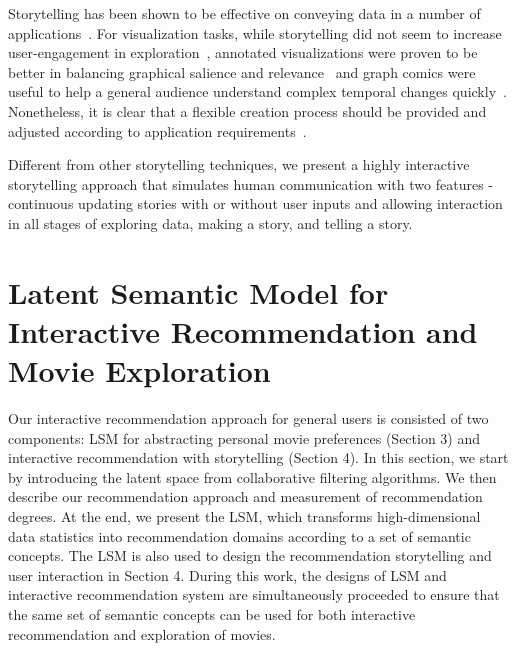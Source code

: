 \documentclass{vgtc}                          %
\begin{document}



Storytelling has been shown to be effective on conveying data in a number of applications~\cite{dragicevic2011temporal, spaulding2013design}.
For visualization tasks, while storytelling did not seem to increase user-engagement in exploration~\cite{boy2015storytelling}, annotated visualizations were proven to be better in balancing graphical salience and relevance~\cite{Hullman:2013:CAG:2470654.2481374} and graph comics were useful to help a general audience understand complex temporal changes quickly~\cite{bach2016telling}.
Nonetheless, it is clear that a flexible creation process should be provided and  adjusted according to application requirements~\cite{mitchell2011limits, 6902874, amini2015understanding}.

Different from other storytelling techniques, we present a highly interactive storytelling approach that simulates human communication with two features - continuous updating stories with or without user inputs and allowing interaction in all stages of exploring data, making a story, and telling a story.


%
\section{Latent Semantic Model for Interactive Recommendation and Movie Exploration} 
\label{latent}

Our interactive recommendation approach for general users is consisted of two components: LSM for abstracting personal movie preferences (Section 3) and interactive recommendation with storytelling (Section 4).
In this section, we start by introducing the latent space from collaborative filtering algorithms.
We then describe our recommendation approach and measurement of recommendation degrees.
At the end, we present the LSM, which transforms high-dimensional data statistics into recommendation domains according to a set of semantic concepts. 
The LSM is also used to design the recommendation storytelling and user interaction in Section 4.
During this work, the designs of LSM and interactive recommendation system are simultaneously proceeded to ensure that the same set of semantic concepts can be used for both interactive recommendation and exploration of movies.
\end{document}

